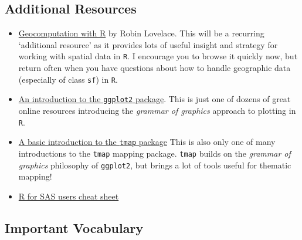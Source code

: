 \documentclass[
]{book}
\providecommand{\tightlist}{%
  \setlength{\itemsep}{0pt}\setlength{\parskip}{0pt}}
\begin{document}
\hypertarget{additional-resources}{%
\subsection{Additional Resources}\label{additional-resources}}

\begin{itemize}
\tightlist
\item
  \href{https://geocompr.robinlovelace.net/}{Geocomputation with R} by Robin Lovelace. This will be a recurring `additional resource' as it provides lots of useful insight and strategy for working with spatial data in \texttt{R}. I encourage you to browse it quickly now, but return often when you have questions about how to handle geographic data (especially of class \texttt{sf}) in \texttt{R}.
\item
  \href{https://ggplot2-book.org/introduction.html}{An introduction to the \texttt{ggplot2} package}. This is just one of dozens of great online resources introducing the \emph{grammar of graphics} approach to plotting in \texttt{R}.
\item
  \href{https://tlorusso.github.io/geodata_workshop/tmap_package\#:~:text=The\%20tmap\%20package\%20is\%20a,as\%20choropleths\%20and\%20bubble\%20maps.}{A basic introduction to the \texttt{tmap} package} This is also only one of many introductions to the \texttt{tmap} mapping package. \texttt{tmap} builds on the \emph{grammar of graphics} philosophy of \texttt{ggplot2}, but brings a lot of tools useful for thematic mapping!
\item
  \href{https://raw.githubusercontent.com/rstudio/cheatsheets/main/sas-r.pdf}{R for SAS users cheat sheet}
\end{itemize}

\hypertarget{important-vocabulary}{%
\subsection{Important Vocabulary}\label{important-vocabulary}}

 
  \providecommand{\huxb}[2]{\arrayrulecolor[RGB]{#1}\global\arrayrulewidth=#2pt}
  \providecommand{\huxvb}[2]{\color[RGB]{#1}\vrule width #2pt}
  \providecommand{\huxtpad}[1]{\rule{0pt}{#1}}
  \providecommand{\huxbpad}[1]{\rule[-#1]{0pt}{#1}}
\end{document}

